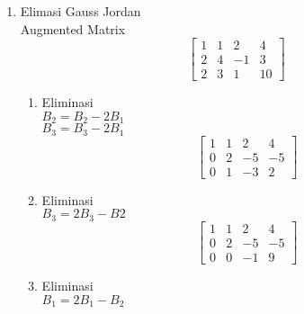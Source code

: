 \documentclass[xcolor=table]{uofa-eng-assignment}
\begin{document}
\begin{enumerate}
\begin{enumerate}
              \item Elimasi Gauss Jordan \\
                    Augmented Matrix
                    \begin{equation}
                        \begin{bmatrix}
                            1 & 1 & 2  & 4  \\
                            2 & 4 & -1 & 3  \\
                            2 & 3 & 1  & 10
                        \end{bmatrix}
                    \end{equation}
                    \begin{enumerate}
                        \item Eliminasi\\
                              $B_2 = B_2 - 2B_1$ \\
                              $B_3 = B_3 - 2B_1$
                              \begin{equation}
                                  \begin{bmatrix}
                                      1 & 1 & 2  & 4  \\
                                      0 & 2 & -5 & -5 \\
                                      0 & 1 & -3 & 2
                                  \end{bmatrix}
                              \end{equation}
                        \item Eliminasi \\
                              $B_3 = 2B_3 - B2$
                              \begin{equation}
                                  \begin{bmatrix}
                                      1 & 1 & 2  & 4  \\
                                      0 & 2 & -5 & -5 \\
                                      0 & 0 & -1 & 9
                                  \end{bmatrix}
                              \end{equation}
                        \item Eliminasi \\
                              $B_1 = 2B_1 - B_2$
                              \begin{equation}

\end{equation}
\end{enumerate}
\end{enumerate}
\end{enumerate}
\end{document}
